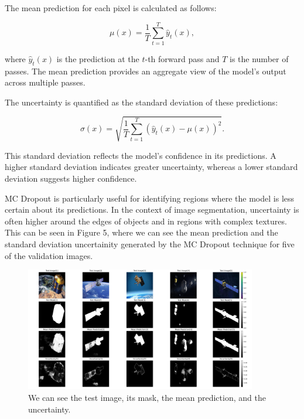 \documentclass{article}
\begin{document}
The mean prediction for each pixel is calculated as follows:

\[
\mu(x) = \frac{1}{T} \sum_{t=1}^{T} \hat{y}_t(x),
\]

where \( \hat{y}_t(x) \) is the prediction at the \( t \)-th forward pass and \( T \) is the number of passes. The mean 
prediction provides an aggregate view of the model's output across multiple passes.

The uncertainty is quantified as the standard deviation of these predictions:

\[
\sigma(x) = \sqrt{\frac{1}{T} \sum_{t=1}^{T} (\hat{y}_t(x) - \mu(x))^2}.
\]

This standard deviation reflects the model's confidence in its predictions. A higher standard deviation indicates greater 
uncertainty, whereas a lower standard deviation suggests higher confidence. 

MC Dropout is particularly useful for identifying regions where the model is less certain about its predictions. In the 
context of image segmentation, uncertainty is often higher around the edges of objects and in regions with complex textures. 
This can be seen in Figure 5, where we can see the mean prediction and the standard deviation uncertainity generated by 
the MC Dropout technique for five of the validation images.

\begin{figure}[h]
    \centering
    \includegraphics[width=0.9\textwidth]{../images/MC_dropout/test_image[0-5].png}
    \caption{We can see the test image, its mask, the mean prediction, and the uncertainty.}
    \label{fig:mc_dropout_single_image}
\end{figure}
\vspace{1em}
\end{document}

